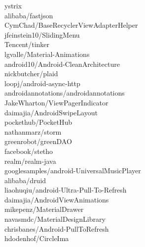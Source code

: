 \documentclass[twoside]{praca}
\begin{document}
\begin{multicols}{3}
ystrix\\alibaba/fastjson\\CymChad/BaseRecycler\-View\-Adapter\-Helper\\jfeinstein10/SlidingMenu\\Tencent/tinker\\lgvalle/Material-Animations\\android10/Android-CleanArchitecture\\nickbutcher/plaid\\loopj/android-async-http\\androidannotations/android\-annotations\\JakeWharton/ViewPager\-Indicator\\daimajia/AndroidSwipe\-Layout\\pockethub/PocketHub\\nathanmarz/storm\\greenrobot/greenDAO\\facebook/stetho\\realm/realm-java\\googlesamples/android-Universal\-Music\-Player\\alibaba/druid\\liaohuqiu/android-Ultra-Pull-To-Refresh\\daimajia/AndroidView\-Animations\\mikepenz/MaterialDrawer\\navasmdc/MaterialDesign\-Library\\chrisbanes/Android-PullToRefresh\\hdodenhof/CircleIma
\end{multicols}
\end{document}
